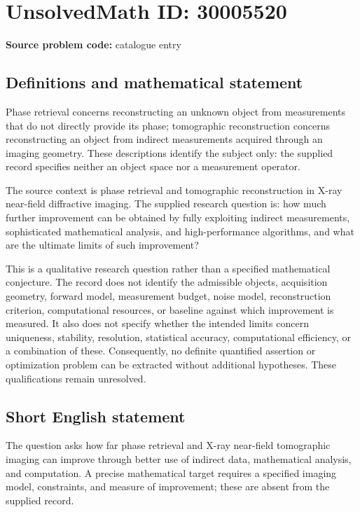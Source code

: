\documentclass[11pt]{article}
\begin{document}
\section*{UnsolvedMath ID: 30005520}
\textbf{Source problem code:} catalogue entry
\subsection{Definitions and mathematical statement}
Phase retrieval concerns reconstructing an unknown object from measurements that do not directly provide its phase; tomographic reconstruction concerns reconstructing an object from indirect measurements acquired through an imaging geometry. These descriptions identify the subject only: the supplied record specifies neither an object space nor a measurement operator.

The source context is phase retrieval and tomographic reconstruction in X-ray near-field diffractive imaging. The supplied research question is: how much further improvement can be obtained by fully exploiting indirect measurements, sophisticated mathematical analysis, and high-performance algorithms, and what are the ultimate limits of such improvement?

This is a qualitative research question rather than a specified mathematical conjecture. The record does not identify the admissible objects, acquisition geometry, forward model, measurement budget, noise model, reconstruction criterion, computational resources, or baseline against which improvement is measured. It also does not specify whether the intended limits concern uniqueness, stability, resolution, statistical accuracy, computational efficiency, or a combination of these. Consequently, no definite quantified assertion or optimization problem can be extracted without additional hypotheses. These qualifications remain unresolved.
\subsection{Short English statement}
The question asks how far phase retrieval and X-ray near-field tomographic imaging can improve through better use of indirect data, mathematical analysis, and computation. A precise mathematical target requires a specified imaging model, constraints, and measure of improvement; these are absent from the supplied record.
\end{document}
